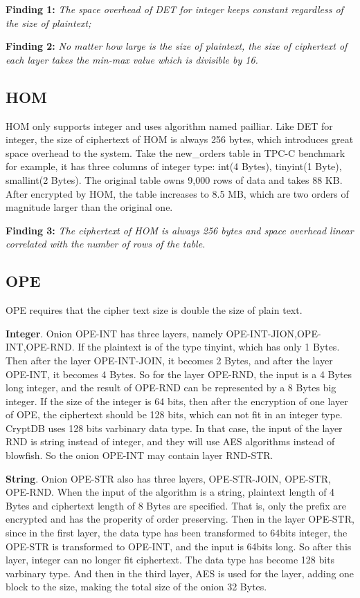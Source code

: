 \textbf{Finding 1:} \textit{The space overhead of DET for integer keeps constant regardless of the size of plaintext;}

\textbf{Finding 2:} \textit{No matter how large is the size of plaintext, the size of ciphertext of each layer takes the min-max value which is divisible by 16.}

\subsection{HOM}
HOM only supports integer and uses algorithm named pailliar. Like DET for integer, the size of ciphertext of HOM is always 256 bytes, which introduces great space overhead to the system. Take the new\_orders table in TPC-C benchmark for example, it has three columns of integer type: int(4 Bytes), tinyint(1 Byte), smallint(2 Bytes). The original table owns 9,000 rows of data and takes 88 KB. After encrypted by HOM, the table increases to 8.5 MB, which are two orders of magnitude larger than the original one.

\textbf{Finding 3:} \textit{The ciphertext of HOM is always 256 bytes and space overhead linear correlated with the number of rows of the table.}

\subsection{OPE}
OPE requires that the cipher text size is double the size of plain text. 

\textbf{Integer}. Onion OPE-INT has three layers, namely OPE-INT-JION,OPE-INT,OPE-RND. If the plaintext is of the type tinyint, which has only 1 Bytes. Then after the layer OPE-INT-JOIN, it becomes 2 Bytes, and after the layer OPE-INT, it becomes 4 Bytes. So for the layer OPE-RND, the input is a 4 Bytes long integer, and the result of OPE-RND can be represented by a 8 Bytes big integer. If the size of the integer is 64 bits, then after the encryption of one layer of OPE, the ciphertext should be 128 bits, which can not fit in an integer type. CryptDB uses 128 bits varbinary data type. In that case, the input of the layer RND is string instead of integer, and they will use AES algorithms instead of blowfish. So the onion OPE-INT may contain layer RND-STR.

\textbf{String}. Onion OPE-STR also has three layers, OPE-STR-JOIN, OPE-STR, OPE-RND. When the input of the algorithm is a string, plaintext length of 4 Bytes and  ciphertext length of 8 Bytes are specified. That is, only the prefix are encrypted and has the properity of order preserving. Then in the layer OPE-STR, since in the first layer, the data type has been transformed to 64bits integer, the OPE-STR is transformed to OPE-INT, and the input is 64bits long. So after this layer, integer can no longer fit ciphertext. The data type has become 128 bits varbinary type. And then in the third layer, AES is used for the layer, adding one block to the size, making the total size of the onion 32 Bytes.



